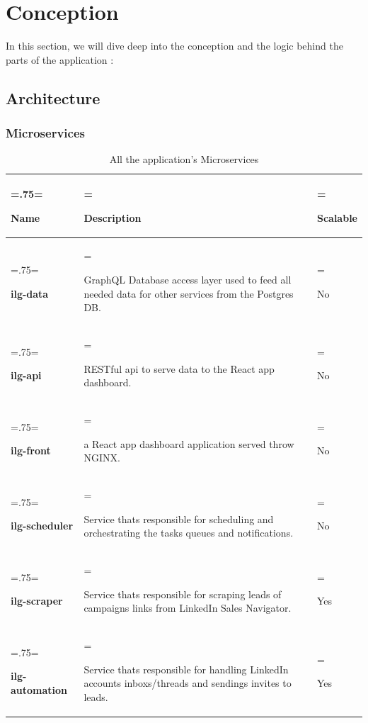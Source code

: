 \newpage
\section{Conception}
In this section, we will dive deep into the conception and the logic behind the parts of the application :
\subsection{Architecture}
\subsubsection{Microservices}
\begin{table}[H]
	\renewcommand{\arraystretch}{1.5}%
	\caption{All the application's Microservices}
	\centering
	\medskip
	\begin{tabularx}{1\textwidth} {
			| >{\hsize=.75\hsize\linewidth=\hsize\raggedright\arraybackslash}X
			| >{\hsize=1.8\hsize\linewidth=\hsize\raggedright\arraybackslash}X
			| >{\hsize=0.45\hsize\linewidth=\hsize\raggedright\arraybackslash}X |}
		\hline
		\rowcolor{primary} \textbf {Name} & \textbf {Description}                                                                                  & \textbf {Scalable} \\
		\hline
		\textbf {ilg-data}                & GraphQL Database access layer used to feed all needed data for other services from the Postgres DB.    & No                 \\
		\hline
		\textbf {ilg-api}                 & RESTful api to serve data to the React app dashboard.                                                  & No                 \\
		\hline
		\textbf {ilg-front}               & a React app dashboard application served throw NGINX.                                                  & No                 \\
		\hline
		\textbf {ilg-scheduler}           & Service thats responsible for scheduling and orchestrating the tasks queues and notifications.         & No                 \\
		\hline
		\textbf {ilg-scraper}             & Service thats responsible for scraping leads of campaigns links from LinkedIn Sales Navigator.         & Yes                \\
		\hline
		\textbf {ilg-automation}          & Service thats responsible for handling LinkedIn accounts inboxs/threads and sendings invites to leads. & Yes                \\
		\hline
	\end{tabularx}
\end{table}
\newpage
